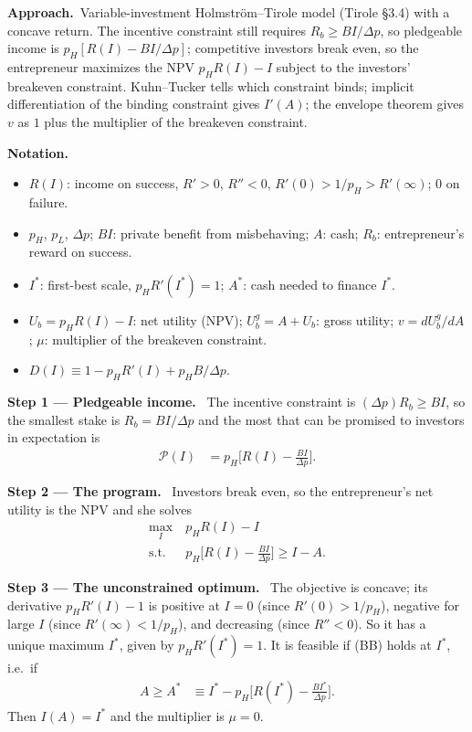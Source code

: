 \documentclass[11pt,a4paper]{article}
\newcommand{\notation}{\par\noindent\textbf{Notation.}}
\newcommand{\step}[2]{\par\medskip\noindent\textbf{Step #1 --- #2.}~}
\newcommand{\approach}{\par\smallskip\noindent\textbf{Approach.}~}
\begin{document}
\approach Variable-investment Holmstr\"om--Tirole model (Tirole \S3.4) with a concave return.
The incentive constraint still requires $R_b\ge BI/\Delta p$, so pledgeable income is
$p_H[R(I)-BI/\Delta p]$; competitive investors break even, so the entrepreneur maximizes the NPV
$p_HR(I)-I$ subject to the investors' breakeven constraint. Kuhn--Tucker tells which constraint
binds; implicit differentiation of the binding constraint gives $I'(A)$; the envelope theorem
gives $v$ as $1$ plus the multiplier of the breakeven constraint.

\notation
\begin{itemize}
  \item $R(I)$: income on success, $R'>0$, $R''<0$, $R'(0)>1/p_H>R'(\infty)$; $0$ on failure.
  \item $p_H$, $p_L$, $\Delta p$; $BI$: private benefit from misbehaving; $A$: cash; $R_b$: entrepreneur's reward on success.
  \item $I^*$: first-best scale, $p_HR'(I^*)=1$; $A^*$: cash needed to finance $I^*$.
  \item $U_b=p_HR(I)-I$: net utility (NPV); $U_b^g=A+U_b$: gross utility; $v=dU_b^g/dA$; $\mu$: multiplier of the breakeven constraint.
  \item $D(I)\equiv 1-p_HR'(I)+p_HB/\Delta p$.
\end{itemize}

\step{1}{Pledgeable income} The incentive constraint is $(\Delta p)R_b\ge BI$, so the smallest
stake is $R_b=BI/\Delta p$ and the most that can be promised to investors in expectation is
\begin{align}
  \mathcal P(I) &= p_H\Big[R(I)-\frac{BI}{\Delta p}\Big]. \label{r4e12-P}
\end{align}

\step{2}{The program} Investors break even, so the entrepreneur's net utility is the NPV and she
solves
\begin{align}
  \max_I\ & p_HR(I)-I \nonumber\\
  \text{s.t. }\ & p_H\Big[R(I)-\frac{BI}{\Delta p}\Big]\ge I-A. \tag{BB}
\end{align}

\step{3}{The unconstrained optimum} The objective is concave; its derivative $p_HR'(I)-1$ is
positive at $I=0$ (since $R'(0)>1/p_H$), negative for large $I$ (since $R'(\infty)<1/p_H$), and
decreasing (since $R''<0$). So it has a unique maximum $I^*$, given by $p_HR'(I^*)=1$. It is
feasible if (BB) holds at $I^*$, i.e.\ if
\begin{align}
  A\ge A^* &\equiv I^*-p_H\Big[R(I^*)-\frac{BI^*}{\Delta p}\Big]. \label{r4e12-Astar}
\end{align}
Then $I(A)=I^*$ and the multiplier is $\mu=0$.
\end{document}
